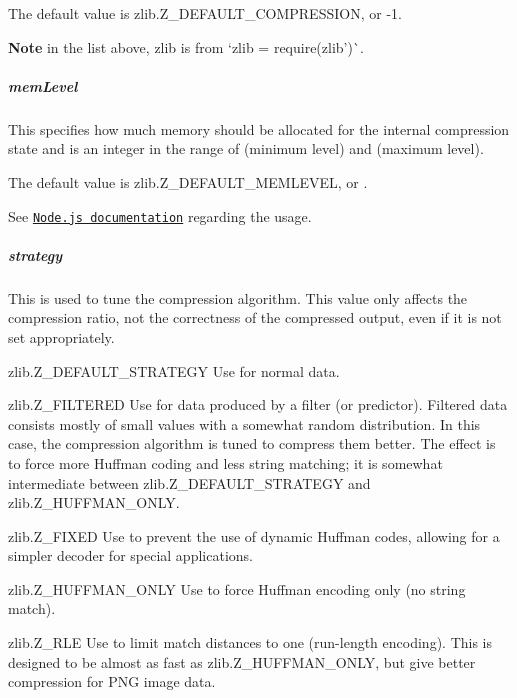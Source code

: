 The default value is {\ttfamily zlib.\+Z\+\_\+\+D\+E\+F\+A\+U\+L\+T\+\_\+\+C\+O\+M\+P\+R\+E\+S\+S\+I\+ON}, or {\ttfamily -\/1}.

{\bfseries Note} in the list above, {\ttfamily zlib} is from `zlib = require(\textquotesingle{}zlib')\`{}.

\subparagraph*{mem\+Level}

This specifies how much memory should be allocated for the internal compression state and is an integer in the range of {} (minimum level) and {} (maximum level).

The default value is {\ttfamily zlib.\+Z\+\_\+\+D\+E\+F\+A\+U\+L\+T\+\_\+\+M\+E\+M\+L\+E\+V\+EL}, or {}.

See \href{http://nodejs.org/api/zlib.html#zlib_memory_usage_tuning}{\tt Node.\+js documentation} regarding the usage.

\subparagraph*{strategy}

This is used to tune the compression algorithm. This value only affects the compression ratio, not the correctness of the compressed output, even if it is not set appropriately.


\begin{DoxyItemize}
\item {\ttfamily zlib.\+Z\+\_\+\+D\+E\+F\+A\+U\+L\+T\+\_\+\+S\+T\+R\+A\+T\+E\+GY} Use for normal data.
\item {\ttfamily zlib.\+Z\+\_\+\+F\+I\+L\+T\+E\+R\+ED} Use for data produced by a filter (or predictor). Filtered data consists mostly of small values with a somewhat random distribution. In this case, the compression algorithm is tuned to compress them better. The effect is to force more Huffman coding and less string matching; it is somewhat intermediate between {\ttfamily zlib.\+Z\+\_\+\+D\+E\+F\+A\+U\+L\+T\+\_\+\+S\+T\+R\+A\+T\+E\+GY} and {\ttfamily zlib.\+Z\+\_\+\+H\+U\+F\+F\+M\+A\+N\+\_\+\+O\+N\+LY}.
\item {\ttfamily zlib.\+Z\+\_\+\+F\+I\+X\+ED} Use to prevent the use of dynamic Huffman codes, allowing for a simpler decoder for special applications.
\item {\ttfamily zlib.\+Z\+\_\+\+H\+U\+F\+F\+M\+A\+N\+\_\+\+O\+N\+LY} Use to force Huffman encoding only (no string match).
\item {\ttfamily zlib.\+Z\+\_\+\+R\+LE} Use to limit match distances to one (run-\/length encoding). This is designed to be almost as fast as {\ttfamily zlib.\+Z\+\_\+\+H\+U\+F\+F\+M\+A\+N\+\_\+\+O\+N\+LY}, but give better compression for P\+NG image data.
\end{DoxyItemize}

